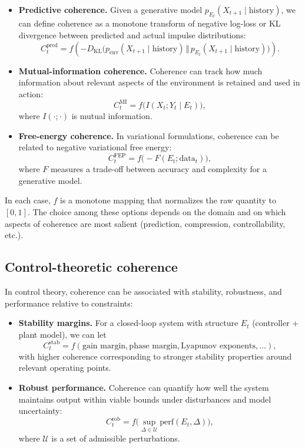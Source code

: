 \documentclass[12pt,a4paper]{report}
\begin{document}
\begin{itemize}[leftmargin=2em]
    \item \textbf{Predictive coherence.} Given a generative model \(p_{E_t}(X_{t+1} \mid \text{history})\), we can define coherence as a monotone transform of negative log-loss or KL divergence between predicted and actual impulse distributions:
    \[
        C_t^{\mathrm{pred}} = f\!\left(- D_{\mathrm{KL}}\bigl(
            p_{\mathrm{env}}(X_{t+1} \mid \text{history})
            \,\Vert\, p_{E_t}(X_{t+1} \mid \text{history})
        \bigr)\right).
    \]
    \item \textbf{Mutual-information coherence.} Coherence can track how much information about relevant aspects of the environment is retained and used in action:
    \[
        C_t^{\mathrm{MI}} = f\!\bigl(I(X_t; Y_t \mid E_t)\bigr),
    \]
    where \(I(\cdot;\cdot)\) is mutual information.
    \item \textbf{Free-energy coherence.} In variational formulations, coherence can be related to negative variational free energy:
    \[
        C_t^{\mathrm{FEP}} = f\!\bigl(-F(E_t; \text{data}_t)\bigr),
    \]
    where \(F\) measures a trade-off between accuracy and complexity for a generative model.
\end{itemize}

In each case, \(f\) is a monotone mapping that normalizes the raw quantity to \([0,1]\). The choice among these options depends on the domain and on which aspects of coherence are most salient (prediction, compression, controllability, etc.).

\subsection*{Control-theoretic coherence}

In control theory, coherence can be associated with stability, robustness, and performance relative to constraints:

\begin{itemize}[leftmargin=2em]
    \item \textbf{Stability margins.} For a closed-loop system with structure \(E_t\) (controller + plant model), we can let
    \[
        C_t^{\mathrm{stab}} = f(\text{gain margin}, \text{phase margin}, \text{Lyapunov exponents}, \dots),
    \]
    with higher coherence corresponding to stronger stability properties around relevant operating points.
    \item \textbf{Robust performance.} Coherence can quantify how well the system maintains output within viable bounds under disturbances and model uncertainty:
    \[
        C_t^{\mathrm{rob}} = f\bigl(\sup_{\Delta \in \mathcal{U}} \text{perf}(E_t,\Delta)\bigr),
    \]
    where \(\mathcal{U}\) is a set of admissible perturbations.
\end{itemize}
\end{document}
